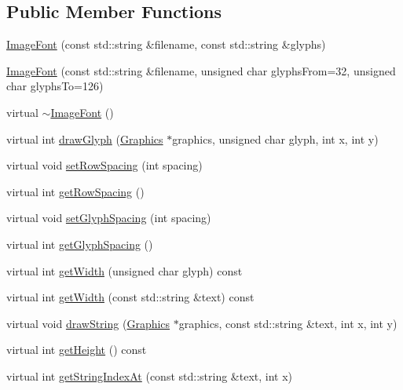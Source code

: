 \subsection*{Public Member Functions}
\begin{DoxyCompactItemize}
\item 
\hyperlink{classgcn_1_1ImageFont_a43a623be5f18290c0ba8d6ce886d74b0}{Image\+Font} (const std\+::string \&filename, const std\+::string \&glyphs)
\item 
\hyperlink{classgcn_1_1ImageFont_a663a7535d33714c4dac20518e41a3653}{Image\+Font} (const std\+::string \&filename, unsigned char glyphs\+From=32, unsigned char glyphs\+To=126)
\item 
virtual \hyperlink{classgcn_1_1ImageFont_aa65f1677811e42ecdc747a4196806ea7}{$\sim$\+Image\+Font} ()
\item 
virtual int \hyperlink{classgcn_1_1ImageFont_ab7c08a441ed8046320c600d7eee77bde}{draw\+Glyph} (\hyperlink{classgcn_1_1Graphics}{Graphics} $\ast$graphics, unsigned char glyph, int x, int y)
\item 
virtual void \hyperlink{classgcn_1_1ImageFont_a6fce0fdaa92f10d9e198311e18e1cea3}{set\+Row\+Spacing} (int spacing)
\item 
virtual int \hyperlink{classgcn_1_1ImageFont_abd478dc1dc02a683775a465f21a56cfc}{get\+Row\+Spacing} ()
\item 
virtual void \hyperlink{classgcn_1_1ImageFont_aca8cc062c7b9d232dec6d994a726958e}{set\+Glyph\+Spacing} (int spacing)
\item 
virtual int \hyperlink{classgcn_1_1ImageFont_a3e8595cfdf106632bbc3b55b026d47a5}{get\+Glyph\+Spacing} ()
\item 
virtual int \hyperlink{classgcn_1_1ImageFont_a7f668b99441084f4199982e7d570781d}{get\+Width} (unsigned char glyph) const 
\item 
virtual int \hyperlink{classgcn_1_1ImageFont_a6432c448c9df16a3ca057b2bd9822663}{get\+Width} (const std\+::string \&text) const 
\item 
virtual void \hyperlink{classgcn_1_1ImageFont_a8717f4ef08e2ba1a1379a4b8fe4b5002}{draw\+String} (\hyperlink{classgcn_1_1Graphics}{Graphics} $\ast$graphics, const std\+::string \&text, int x, int y)
\item 
virtual int \hyperlink{classgcn_1_1ImageFont_ae18f2d854e42ce5aafd44e8b8c6ff048}{get\+Height} () const 
\item 
virtual int \hyperlink{classgcn_1_1ImageFont_a5b0e7a7a7acdcb9fadb232f63608b354}{get\+String\+Index\+At} (const std\+::string \&text, int x)
\end{DoxyCompactItemize}
